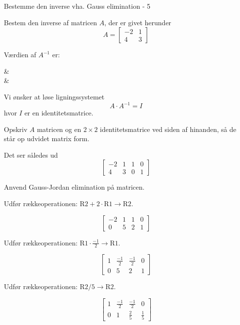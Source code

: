 \documentclass{article}
\begin{document}
\begin{exercise}{Bestemme den inverse vha. Gauss elimination - 5}
	
	Bestem den inverse af matricen $A$, der er givet herunder
	\[
	A = \left[\begin{array}{cc}
	-2 & 1 \\ 
	4 & 3
	\end{array} \right]
	\]
	
	Værdien af $A^{-1}$ er:
	\begin{answermatrix}
		 &  \\
		 & 
	\end{answermatrix}
	
	\hint
	Vi ønsker at løse ligningssystemet
	\[
	A \cdot A^{-1} = I
	\]
	hvor $I$ er en identitetsmatrice.
	
	\hint
	Opskriv $A$ matricen og en $2 \times 2$ identitetsmatrice
	ved siden af hinanden, så de står op udvidet matrix form.
	
	\hint
	Det ser således ud
	\[
	\left[\begin{array}{cc|cc}
	-2 & 1 & 1 & 0 \\ 
	4 & 3 & 0 & 1
	\end{array} \right]
	\]
	
	\hint
	Anvend Gauss-Jordan elimination på matricen.
	
	\hint
	Udfør rækkeoperationen: $\text{R2} + 2 \cdot \text{R1} \to \text{R2}$.
	
	\hint
	\[
	\left[\begin{array}{cc|cc}
	-2 & 1 & 1 & 0 \\ 
	0 & 5 & 2 & 1
	\end{array} \right]
	\]
	
	\hint
	Udfør rækkeoperationen: $\text{R1} \cdot \frac{-1}{2} \to \text{R1}$.
	
	\hint
	\[
	\left[\begin{array}{cc|cc}
	1 & \frac{-1}{2} & \frac{-1}{2} & 0 \\ 
	0 & 5 & 2 & 1
	\end{array} \right]
	\]
	
	\hint
	Udfør rækkeoperationen: $\text{R2} / 5 \to \text{R2}$.
	
	\hint
	\[
	\left[\begin{array}{cc|cc}
	1 & \frac{-1}{2} & \frac{-1}{2} & 0 \\ 
	0 & 1 & \frac{2}{5} & \frac{1}{5}
	\end{array} \right]
	\]
	

\end{exercise}
\end{document}

